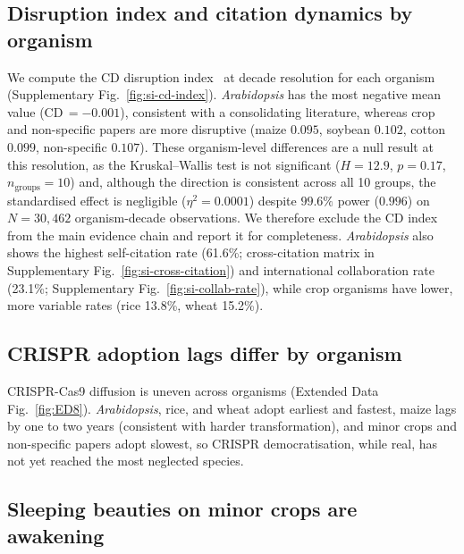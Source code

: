
\subsection*{Disruption index and citation dynamics by organism}

We compute the CD disruption index~\cite{funk2017disruption} at decade resolution
for each organism (Supplementary Fig.~\ref{fig:si-cd-index}). \textit{Arabidopsis} has the most
negative mean value (CD\,$= -0.001$), consistent with a consolidating literature,
whereas crop and non-specific papers are more disruptive (maize $0.095$, soybean
$0.102$, cotton $0.099$, non-specific $0.107$). These organism-level differences
are a null result at this resolution, as the Kruskal--Wallis test is not significant
($H = 12.9$, $p = 0.17$, $n_{\mathrm{groups}} = 10$) and, although the direction is
consistent across all 10 groups, the standardised effect is negligible
($\eta^2 = 0.0001$) despite $99.6\%$ power ($0.996$) on $N = 30{,}462$
organism-decade observations. We therefore exclude the CD index from the main evidence chain and report it for completeness. \textit{Arabidopsis} also shows the
highest self-citation rate (61.6\%; cross-citation matrix in Supplementary
Fig.~\ref{fig:si-cross-citation}) and international collaboration rate (23.1\%; Supplementary
Fig.~\ref{fig:si-collab-rate}), while crop organisms have lower, more variable rates
(rice 13.8\%, wheat 15.2\%).

\subsection*{CRISPR adoption lags differ by organism}

CRISPR-Cas9 diffusion is uneven across organisms (Extended Data
Fig.~\ref{fig:ED8}). \textit{Arabidopsis}, rice, and wheat adopt earliest and
fastest, maize lags by one to two years (consistent with harder transformation),
and minor crops and non-specific papers adopt slowest, so CRISPR
democratisation, while real, has not yet reached the most neglected species.


\subsection*{Sleeping beauties on minor crops are awakening}


